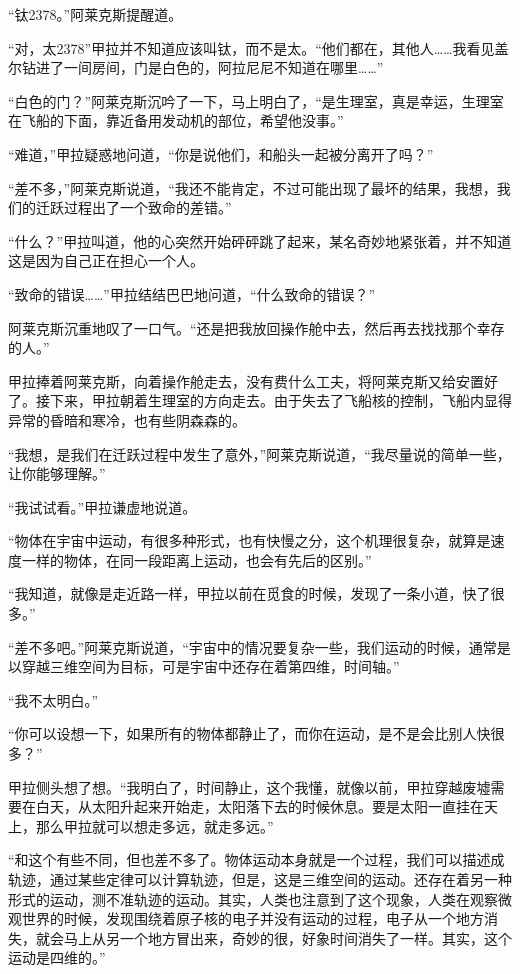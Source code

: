 “钛2378。”阿莱克斯提醒道。 

“对，太2378”甲拉并不知道应该叫钛，而不是太。“他们都在，其他人……我看见盖尔钻进了一间房间，门是白色的，阿拉尼尼不知道在哪里……” 

“白色的门？”阿莱克斯沉吟了一下，马上明白了，“是生理室，真是幸运，生理室在飞船的下面，靠近备用发动机的部位，希望他没事。” 

“难道，”甲拉疑惑地问道，“你是说他们，和船头一起被分离开了吗？” 

“差不多，”阿莱克斯说道，“我还不能肯定，不过可能出现了最坏的结果，我想，我们的迁跃过程出了一个致命的差错。” 

“什么？”甲拉叫道，他的心突然开始砰砰跳了起来，某名奇妙地紧张着，并不知道这是因为自己正在担心一个人。 

“致命的错误……”甲拉结结巴巴地问道，“什么致命的错误？” 

阿莱克斯沉重地叹了一口气。“还是把我放回操作舱中去，然后再去找找那个幸存的人。” 

甲拉捧着阿莱克斯，向着操作舱走去，没有费什么工夫，将阿莱克斯又给安置好了。接下来，甲拉朝着生理室的方向走去。由于失去了飞船核的控制，飞船内显得异常的昏暗和寒冷，也有些阴森森的。 

“我想，是我们在迁跃过程中发生了意外，”阿莱克斯说道，“我尽量说的简单一些，让你能够理解。” 

“我试试看。”甲拉谦虚地说道。 

“物体在宇宙中运动，有很多种形式，也有快慢之分，这个机理很复杂，就算是速度一样的物体，在同一段距离上运动，也会有先后的区别。” 

“我知道，就像是走近路一样，甲拉以前在觅食的时候，发现了一条小道，快了很多。” 

“差不多吧。”阿莱克斯说道，“宇宙中的情况要复杂一些，我们运动的时候，通常是以穿越三维空间为目标，可是宇宙中还存在着第四维，时间轴。” 

“我不太明白。” 

“你可以设想一下，如果所有的物体都静止了，而你在运动，是不是会比别人快很多？” 

甲拉侧头想了想。“我明白了，时间静止，这个我懂，就像以前，甲拉穿越废墟需要在白天，从太阳升起来开始走，太阳落下去的时候休息。要是太阳一直挂在天上，那么甲拉就可以想走多远，就走多远。” 

“和这个有些不同，但也差不多了。物体运动本身就是一个过程，我们可以描述成轨迹，通过某些定律可以计算轨迹，但是，这是三维空间的运动。还存在着另一种形式的运动，测不准轨迹的运动。其实，人类也注意到了这个现象，人类在观察微观世界的时候，发现围绕着原子核的电子并没有运动的过程，电子从一个地方消失，就会马上从另一个地方冒出来，奇妙的很，好象时间消失了一样。其实，这个运动是四维的。” 

